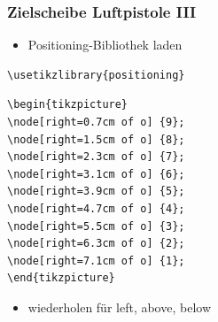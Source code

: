 \documentclass[14pt,ngerman]{beamer}
\begin{document}
\begin{frame}[containsverbatim]
\frametitle{Zielscheibe Luftpistole III} %

\begin{itemize}
	\item Positioning-Bibliothek laden
\end{itemize}


\begin{lstlisting}
\usetikzlibrary{positioning} 
\end{lstlisting}

\begin{lstlisting}
\begin{tikzpicture}
\node[right=0.7cm of o] {9};
\node[right=1.5cm of o] {8};
\node[right=2.3cm of o] {7};
\node[right=3.1cm of o] {6};
\node[right=3.9cm of o] {5};
\node[right=4.7cm of o] {4};
\node[right=5.5cm of o] {3};
\node[right=6.3cm of o] {2};
\node[right=7.1cm of o] {1};
\end{tikzpicture}
\end{lstlisting}\vspace*{-0.2cm}

\begin{itemize}
	\item wiederholen für left, above, below
\end{itemize}
\end{frame}
\end{document}
